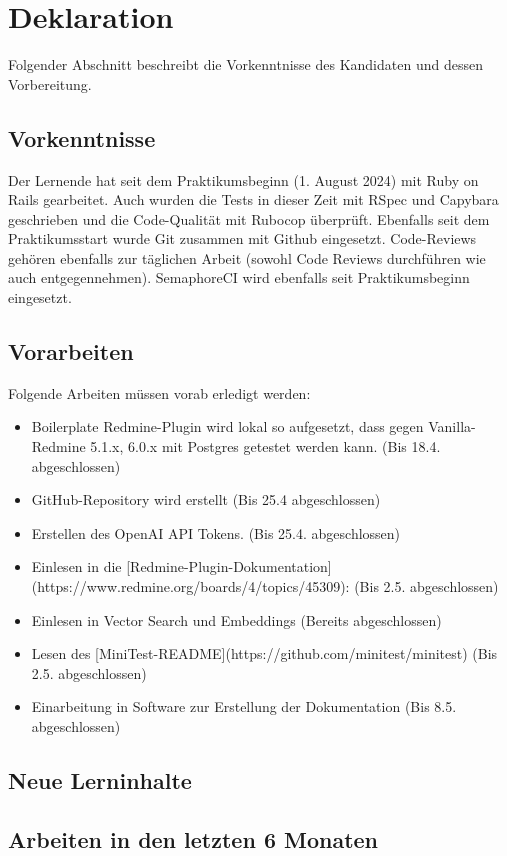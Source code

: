 \chapter{Deklaration}

Folgender Abschnitt beschreibt die Vorkenntnisse des Kandidaten und dessen Vorbereitung.

\section{Vorkenntnisse}

Der Lernende hat seit dem Praktikumsbeginn (1. August 2024) mit Ruby on Rails gearbeitet. Auch wurden die Tests in dieser Zeit mit RSpec und Capybara geschrieben und die Code-Qualität mit Rubocop überprüft. Ebenfalls seit dem Praktikumsstart wurde Git zusammen mit Github eingesetzt. Code-Reviews gehören ebenfalls zur täglichen Arbeit (sowohl Code Reviews durchführen wie auch entgegennehmen). SemaphoreCI wird ebenfalls seit Praktikumsbeginn eingesetzt.

\section{Vorarbeiten}

Folgende Arbeiten müssen vorab erledigt werden:

\begin{itemize}
  \item[\checkmark] Boilerplate Redmine-Plugin wird lokal so aufgesetzt, dass gegen Vanilla-Redmine 5.1.x, 6.0.x mit Postgres getestet werden kann. (Bis 18.4. abgeschlossen)
  \item[\checkmark] GitHub-Repository wird erstellt (Bis 25.4 abgeschlossen)
  \item[\checkmark] Erstellen des OpenAI API Tokens. (Bis 25.4. abgeschlossen)
  \item[\checkmark] Einlesen in die [Redmine-Plugin-Dokumentation](https://www.redmine.org/boards/4/topics/45309): (Bis 2.5. abgeschlossen)
  \item[\checkmark] Einlesen in Vector Search und Embeddings (Bereits abgeschlossen)
  \item[\checkmark] Lesen des [MiniTest-README](https://github.com/minitest/minitest) (Bis 2.5. abgeschlossen)
  \item[\checkmark] Einarbeitung in Software zur Erstellung der Dokumentation (Bis 8.5. abgeschlossen)
\end{itemize}

\section{Neue Lerninhalte}

\lipsum[13]

\section{Arbeiten in den letzten 6 Monaten}

\lipsum[14]
